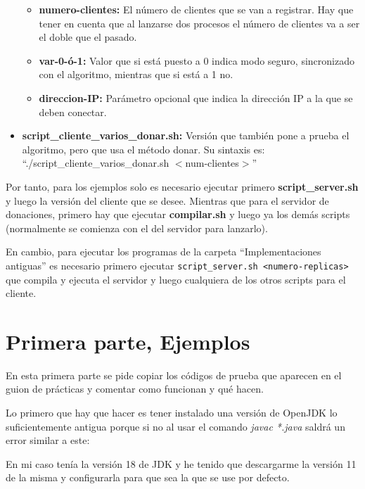 \documentclass{article}
\begin{document}
\begin{itemize}
    \begin{itemize}
        \item \textbf{numero-clientes: }El número de clientes que se van a registrar. Hay que tener en cuenta que al lanzarse dos procesos el número de clientes va a ser el doble que el pasado.
        \item \textbf{var-0-ó-1: }Valor que si está puesto a 0 indica modo seguro, sincronizado con el algoritmo, mientras que si está a 1 no.
        \item \textbf{direccion-IP: }Parámetro opcional que indica la dirección IP a la que se deben conectar.
    \end{itemize}

    \item \textbf{script\_cliente\_varios\_donar.sh: }Versión que también pone a prueba el algoritmo, pero que usa el método donar. Su sintaxis es: ``./script\_cliente\_varios\_donar.sh $<$num-clientes$>$''
\end{itemize}

Por tanto, para los ejemplos solo es necesario ejecutar primero \textbf{script\_server.sh} y luego la versión del cliente que se desee. Mientras que para el servidor de donaciones, primero hay que ejecutar \textbf{compilar.sh} y luego ya los demás scripts (normalmente se comienza con el del servidor para lanzarlo).

\bigskip

En cambio, para ejecutar los programas de la carpeta ``Implementaciones antiguas'' es necesario primero ejecutar \verb|script_server.sh <numero-replicas>| que compila y ejecuta el servidor y luego cualquiera de los otros scripts para el cliente.

\section{Primera parte, Ejemplos}
En esta primera parte se pide copiar los códigos de prueba que aparecen en el guion de prácticas y comentar como funcionan y qué hacen.

\bigskip

Lo primero que hay que hacer es tener instalado una versión de OpenJDK lo suficientemente antigua porque si no al usar el comando \textit{javac *.java} saldrá un error similar a este:


En mi caso tenía la versión 18 de JDK y he tenido que descargarme la versión 11 de la misma y configurarla para que sea la que se use por defecto.
\end{document}
